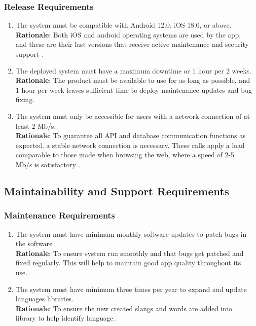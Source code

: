 \subsubsection{Release Requirements}
\label{ssub:release_requirements}
\begin{enumerate}[{OE-R}1. ]
	\item The system must be compatible with Android 12.0, iOS 18.0, or above.
	\\ \textbf{Rationale}: Both iOS and android operating systems are used by the app, and these are their last versions that receive active maintenance and security support \cite{EndOfLife2025_Android,EndOfLife2025_iOS}. 
	\item The deployed system must have a maximum downtime or 1 hour per 2 weeks.
	\\ \textbf{Rationale}: The product must be available to use for as long as possible, and 1 hour per week leaves sufficient time to deploy maintenance updates and bug fixing.
	\item The system must only be accessible for users with a network connection of at least 2 Mb/s.
	\\ \textbf{Rationale}: To guarantee all API and database communication functions as expected, a stable network connection is necessary. These calls apply a load comparable to those made when browsing the web, where a speed of 2-5 Mb/s is satisfactory \cite{Speedtest2025}.
\end{enumerate}


\subsection{Maintainability and Support Requirements}
\label{sub:maintainability_and_support_requirements}

\subsubsection{Maintenance Requirements}
\label{ssub:maintenance_requirements}
\begin{enumerate}[{MS-M}1. ]
	\item The system must have minimum monthly software updates to patch bugs in the software  
	\\ \textbf{Rationale}: To ensure system 	run smoothly and that bugs get patched and fixed regularly. This will help to maintain 	good app quality throughout its use.
	\item The system must have minimum three times per year to expand and update languages libraries. 
	\\ \textbf{Rationale}: To ensure the new created slangs and words are added into library to help identify language.
\end{enumerate}

